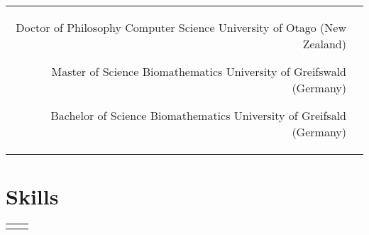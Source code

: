 \documentclass[10pt]{article} %
\begin{document}
\begin{paracol}{2}


\begin{supertabular}{rp{7cm}} %

	{Doctor of Philosophy}
	{}
	{Computer Science}
	{University of Otago (New Zealand)}

	{Master of Science}
	{}
	{Biomathematics}
	{University of Greifswald (Germany)}

	{Bachelor of Science} %
	{} %
	{Biomathematics} %
	{University of Greifsald (Germany)} %

	

\end{supertabular}



\section{Skills} 





\begin{supertabular}{rp{7cm}} %
	
	
	

\end{supertabular}
\end{paracol}
\end{document}
